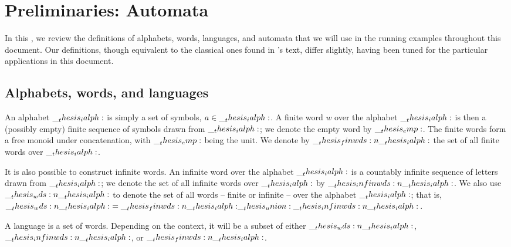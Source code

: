 \chapter{Preliminaries: Automata}\label{ch:automata}

In this , we review the definitions of alphabets, words, languages, and automata that we will use in the running examples throughout this document.
Our definitions, though equivalent to the classical ones found in \textcite{Hopcroft+Ullman:??}'s text, differ slightly, having been tuned for the particular applications in this document.

\section{Alphabets, words, and languages}

An alphabet $\__thesis_ialph:$ is simply a set of symbols, $a \in \__thesis_ialph:$.
A finite word $w$ over the alphabet $\__thesis_ialph:$ is then a (possibly empty) finite sequence of symbols drawn from $\__thesis_ialph:$;
we denote the empty word by $\__thesis_emp:$.
The finite words form a free monoid under concatenation, with $\__thesis_emp:$ being the unit.
We denote by $\__thesis_finwds:n {\__thesis_ialph:}$ the set of all finite words over $\__thesis_ialph:$.

It is also possible to construct infinite words.
An infinite word over the alphabet $\__thesis_ialph:$ is a countably infinite sequence of letters drawn from $\__thesis_ialph:$;
we denote the set of all infinite words over $\__thesis_ialph:$ by $\__thesis_infinwds:n {\__thesis_ialph:}$.
We also use $\__thesis_wds:n {\__thesis_ialph:}$ to denote the set of all words -- finite or infinite -- over the alphabet $\__thesis_ialph:$; that is, $\__thesis_wds:n {\__thesis_ialph:} = \__thesis_finwds:n {\__thesis_ialph:} \__thesis_union: \__thesis_infinwds:n {\__thesis_ialph:}$.

A language is a set of words.
Depending on the context, it will be a subset of either $\__thesis_wds:n {\__thesis_ialph:}$, $\__thesis_infinwds:n {\__thesis_ialph:}$, or $\__thesis_finwds:n {\__thesis_ialph:}$.




